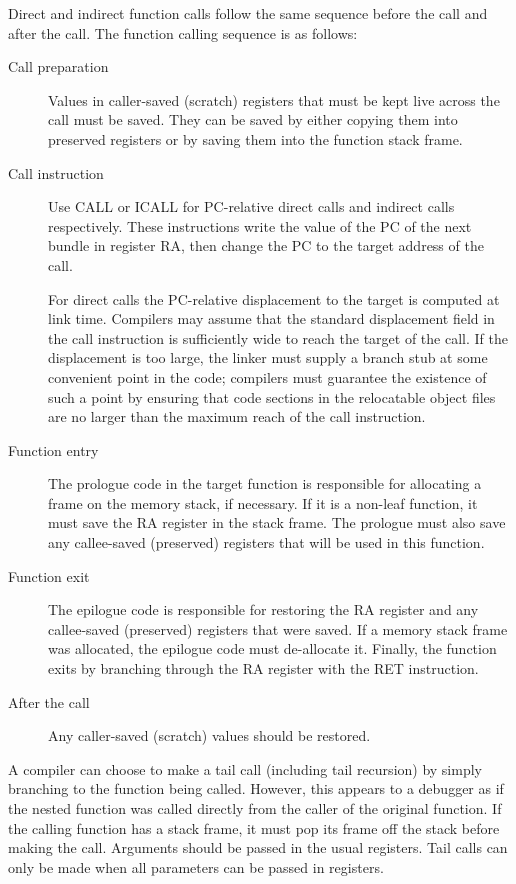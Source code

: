 Direct and indirect function calls follow the same sequence before the call and
after the call. The function calling sequence is as follows: \begin{description}

\item[Call preparation] Values in caller-saved (scratch) registers that must be
kept live across the call must be saved. They can be saved by either copying
them into preserved registers or by saving them into the function stack frame.

\item[Call instruction] Use CALL or ICALL for PC-relative direct calls and
indirect calls respectively. These instructions write the value of the PC of
the next bundle in register RA, then change the PC to the target address of the
call.

For direct calls the PC-relative displacement to the target is computed at
link time.  Compilers may assume that the standard displacement field in the
call instruction is sufficiently wide to reach the target of the call. If the
displacement is too large, the linker must supply a branch stub at some
convenient point in the code; compilers must guarantee the existence of such a
point by ensuring that code sections in the relocatable object files are no
larger than the maximum reach of the call instruction.

\item[Function entry] The prologue code in the target function is responsible
for allocating a frame on the memory stack, if necessary.  If it is a
non-leaf function, it must save the RA register in the stack frame.  The
prologue must also save any callee-saved (preserved) registers that will be used
in this function.

\item[Function exit] The epilogue code is responsible for restoring the RA
register and any callee-saved (preserved) registers that were saved.  If a
memory stack frame was allocated, the epilogue code must de-allocate it.
Finally, the function exits by branching through the RA register with the RET
instruction.

\item[After the call] Any caller-saved (scratch) values should be restored.

\end{description}

A compiler can choose to make a tail call (including tail recursion) by simply
branching to the function being called. However, this appears to a debugger as
if the nested function was called directly from the caller of the original
function.  If the calling function has a stack frame, it must pop its frame off
the stack before making the call. Arguments should be passed in the usual
registers.  Tail calls can only be made when all parameters can be passed in
registers.


